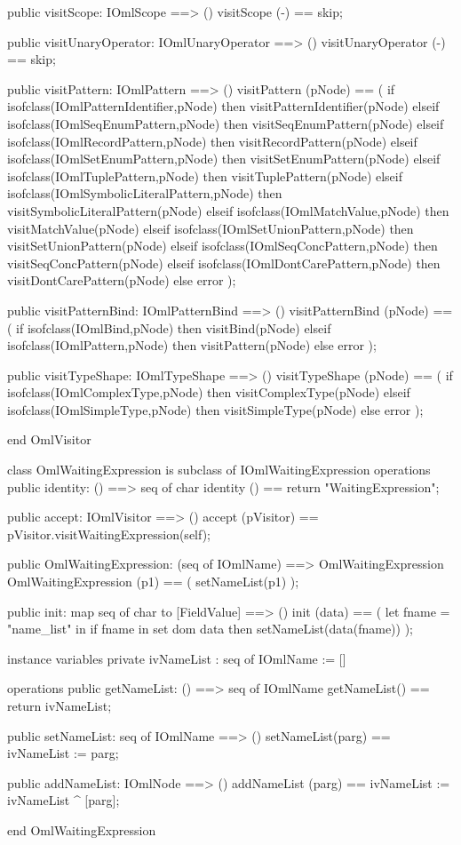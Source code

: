 \begin{vdm_al}
  public visitScope: IOmlScope ==> ()
  visitScope (-) == skip;

  public visitUnaryOperator: IOmlUnaryOperator ==> ()
  visitUnaryOperator (-) == skip;

  public visitPattern: IOmlPattern ==> ()
  visitPattern (pNode) ==
    ( if isofclass(IOmlPatternIdentifier,pNode) then visitPatternIdentifier(pNode)
      elseif isofclass(IOmlSeqEnumPattern,pNode) then visitSeqEnumPattern(pNode)
      elseif isofclass(IOmlRecordPattern,pNode) then visitRecordPattern(pNode)
      elseif isofclass(IOmlSetEnumPattern,pNode) then visitSetEnumPattern(pNode)
      elseif isofclass(IOmlTuplePattern,pNode) then visitTuplePattern(pNode)
      elseif isofclass(IOmlSymbolicLiteralPattern,pNode) then visitSymbolicLiteralPattern(pNode)
      elseif isofclass(IOmlMatchValue,pNode) then visitMatchValue(pNode)
      elseif isofclass(IOmlSetUnionPattern,pNode) then visitSetUnionPattern(pNode)
      elseif isofclass(IOmlSeqConcPattern,pNode) then visitSeqConcPattern(pNode)
      elseif isofclass(IOmlDontCarePattern,pNode) then visitDontCarePattern(pNode)
      else error );

  public visitPatternBind: IOmlPatternBind ==> ()
  visitPatternBind (pNode) ==
    ( if isofclass(IOmlBind,pNode) then visitBind(pNode)
      elseif isofclass(IOmlPattern,pNode) then visitPattern(pNode)
      else error );

  public visitTypeShape: IOmlTypeShape ==> ()
  visitTypeShape (pNode) ==
    ( if isofclass(IOmlComplexType,pNode) then visitComplexType(pNode)
      elseif isofclass(IOmlSimpleType,pNode) then visitSimpleType(pNode)
      else error );

end OmlVisitor
\end{vdm_al}
\begin{vdm_al}
class OmlWaitingExpression is subclass of IOmlWaitingExpression
operations
  public identity: () ==> seq of char
  identity () == return "WaitingExpression";

  public accept: IOmlVisitor ==> ()
  accept (pVisitor) == pVisitor.visitWaitingExpression(self);

  public OmlWaitingExpression:
      (seq of IOmlName) ==> OmlWaitingExpression
  OmlWaitingExpression (p1) == 
   ( setNameList(p1) );

  public init: map seq of char to [FieldValue] ==> ()
  init (data) ==
    ( let fname = "name_list" in
        if fname in set dom data
        then setNameList(data(fname)) );

instance variables
  private ivNameList : seq of IOmlName := []

operations
  public getNameList: () ==> seq of IOmlName
  getNameList() == return ivNameList;

  public setNameList: seq of IOmlName ==> ()
  setNameList(parg) == ivNameList := parg;

  public addNameList: IOmlNode ==> ()
  addNameList (parg) == ivNameList := ivNameList ^ [parg];

end OmlWaitingExpression
\end{vdm_al}

